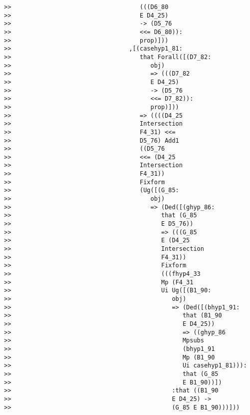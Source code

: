 \documentclass[12pt]{article}
\begin{document}
\begin{verbatim}
>>                                    (((D6_80
>>                                    E D4_25)
>>                                    -> (D5_76
>>                                    <<= D6_80)):
>>                                    prop)]))
>>                                 ,[(casehyp1_81:
>>                                    that Forall([(D7_82:
>>                                       obj)
>>                                       => (((D7_82
>>                                       E D4_25)
>>                                       -> (D5_76
>>                                       <<= D7_82)):
>>                                       prop)]))
>>                                    => ((((D4_25
>>                                    Intersection
>>                                    F4_31) <<=
>>                                    D5_76) Add1
>>                                    ((D5_76
>>                                    <<= (D4_25
>>                                    Intersection
>>                                    F4_31))
>>                                    Fixform
>>                                    (Ug([(G_85:
>>                                       obj)
>>                                       => (Ded([(ghyp_86:
>>                                          that (G_85
>>                                          E D5_76))
>>                                          => (((G_85
>>                                          E (D4_25
>>                                          Intersection
>>                                          F4_31))
>>                                          Fixform
>>                                          (((fhyp4_33
>>                                          Mp (F4_31
>>                                          Ui Ug([(B1_90:
>>                                             obj)
>>                                             => (Ded([(bhyp1_91:
>>                                                that (B1_90
>>                                                E D4_25))
>>                                                => ((ghyp_86
>>                                                Mpsubs
>>                                                (bhyp1_91
>>                                                Mp (B1_90
>>                                                Ui casehyp1_81))):
>>                                                that (G_85
>>                                                E B1_90))])
>>                                             :that ((B1_90
>>                                             E D4_25) ->
>>                                             (G_85 E B1_90)))]))

\end{verbatim}
\end{document}
